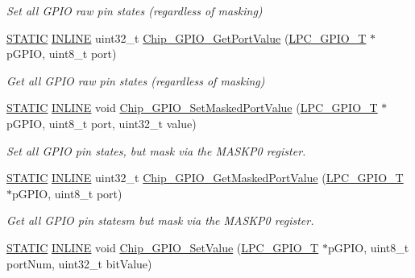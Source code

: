 \begin{DoxyCompactItemize}
\begin{DoxyCompactList}\small\item\em Set all G\+P\+IO raw pin states (regardless of masking) \end{DoxyCompactList}\item 
\hyperlink{group___l_p_c___types___public___macros_ga10b2d890d871e1489bb02b7e70d9bdfb}{S\+T\+A\+T\+IC} \hyperlink{spifi__18xx__43xx_8h_a2eb6f9e0395b47b8d5e3eeae4fe0c116}{I\+N\+L\+I\+NE} uint32\+\_\+t \hyperlink{group___g_p_i_o__18_x_x__43_x_x_ga14c7161208fed3f7ac4e62953353ab9b}{Chip\+\_\+\+G\+P\+I\+O\+\_\+\+Get\+Port\+Value} (\hyperlink{struct_l_p_c___g_p_i_o___t}{L\+P\+C\+\_\+\+G\+P\+I\+O\+\_\+T} $\ast$p\+G\+P\+IO, uint8\+\_\+t port)
\begin{DoxyCompactList}\small\item\em Get all G\+P\+IO raw pin states (regardless of masking) \end{DoxyCompactList}\item 
\hyperlink{group___l_p_c___types___public___macros_ga10b2d890d871e1489bb02b7e70d9bdfb}{S\+T\+A\+T\+IC} \hyperlink{spifi__18xx__43xx_8h_a2eb6f9e0395b47b8d5e3eeae4fe0c116}{I\+N\+L\+I\+NE} void \hyperlink{group___g_p_i_o__18_x_x__43_x_x_ga45e5422fd37f991f4ff46cdc0090efb4}{Chip\+\_\+\+G\+P\+I\+O\+\_\+\+Set\+Masked\+Port\+Value} (\hyperlink{struct_l_p_c___g_p_i_o___t}{L\+P\+C\+\_\+\+G\+P\+I\+O\+\_\+T} $\ast$p\+G\+P\+IO, uint8\+\_\+t port, uint32\+\_\+t value)
\begin{DoxyCompactList}\small\item\em Set all G\+P\+IO pin states, but mask via the M\+A\+S\+K\+P0 register. \end{DoxyCompactList}\item 
\hyperlink{group___l_p_c___types___public___macros_ga10b2d890d871e1489bb02b7e70d9bdfb}{S\+T\+A\+T\+IC} \hyperlink{spifi__18xx__43xx_8h_a2eb6f9e0395b47b8d5e3eeae4fe0c116}{I\+N\+L\+I\+NE} uint32\+\_\+t \hyperlink{group___g_p_i_o__18_x_x__43_x_x_gaa5b183d37e81118b37b30a71279c032b}{Chip\+\_\+\+G\+P\+I\+O\+\_\+\+Get\+Masked\+Port\+Value} (\hyperlink{struct_l_p_c___g_p_i_o___t}{L\+P\+C\+\_\+\+G\+P\+I\+O\+\_\+T} $\ast$p\+G\+P\+IO, uint8\+\_\+t port)
\begin{DoxyCompactList}\small\item\em Get all G\+P\+IO pin statesm but mask via the M\+A\+S\+K\+P0 register. \end{DoxyCompactList}\item 
\hyperlink{group___l_p_c___types___public___macros_ga10b2d890d871e1489bb02b7e70d9bdfb}{S\+T\+A\+T\+IC} \hyperlink{spifi__18xx__43xx_8h_a2eb6f9e0395b47b8d5e3eeae4fe0c116}{I\+N\+L\+I\+NE} void \hyperlink{group___g_p_i_o__18_x_x__43_x_x_ga88bed30fb124192d45c7bed021636643}{Chip\+\_\+\+G\+P\+I\+O\+\_\+\+Set\+Value} (\hyperlink{struct_l_p_c___g_p_i_o___t}{L\+P\+C\+\_\+\+G\+P\+I\+O\+\_\+T} $\ast$p\+G\+P\+IO, uint8\+\_\+t port\+Num, uint32\+\_\+t bit\+Value)

\end{DoxyCompactItemize}
